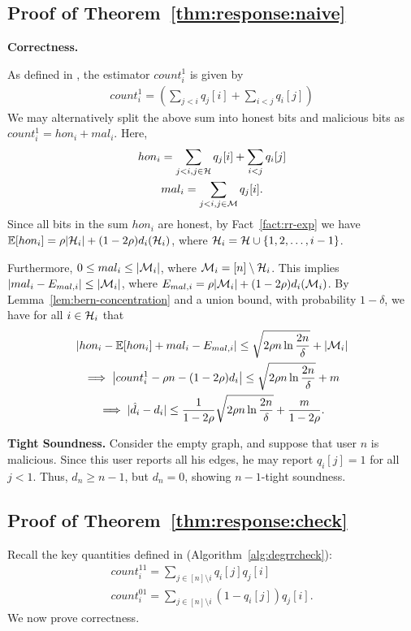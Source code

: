 \subsection{Proof of Theorem~\ref{thm:response:naive}}\label{app:thm:response:naive}
\noindent \textbf{Correctness.}

As defined in \DegRRNaive{}, the estimator $count_i^1$ is given by 
\begin{gather}count^1_i=(\sum_{j < i} q_j[i] + \sum_{i < j} q_i[j])\end{gather}
We may alternatively split the above sum into honest bits and malicious bits as $count^1_i = hon_i + mal_i$. Here, 
\begin{gather*}
hon_i = \sum_{j < i, j \in \mathcal{H}} q_j[i] + \sum_{i < j} q_i[j] \\
mal_i = \sum_{j < i, j \in \mathcal{M}} q_j[i].
\end{gather*}
Since all bits in the sum $hon_i$ are honest, by Fact~\ref{fact:rr-exp} we have $\operatorname{\mathbb{E}}[hon_i] = \rho|\mathcal{H}_i| + (1-2\rho) d_i(\mathcal{H}_i)$, where $\mathcal{H}_i = \mathcal{H} \cup \{1, 2, \ldots, i-1\}$. 

Furthermore, $0 \leq mal_i \leq |\mathcal{M}_i|$, where $\mathcal{M}_i = [n] \setminus \mathcal{H}_i$. This implies $|mal_i - E_{mal,i}| \leq |\mathcal{M}_i|$, where $E_{mal,i} = \rho|\mathcal{M}_i| + (1-2\rho) d_i(\mathcal{M}_i)$.
By Lemma~\ref{lem:bern-concentration} and a union bound, with probability $1-\delta$, we have for all $i \in \mathcal{H}_i$ that
\begin{gather*}
\left|hon_i - \operatorname{\mathbb{E}}[hon_i] + mal_i - E_{mal,i} \right| \leq  \sqrt{2\rho n \ln \frac{2n}{\delta}} + |\mathcal{M}_i| \\ 
\implies \left|count_i^1 - \rho n - (1-2\rho)d_i \right| \leq  \sqrt{2\rho n \ln \frac{2n}{\delta}} + m \\ 
\implies |\hat{d}_i - d_i | \leq \frac{1}{1-2\rho} \sqrt{2\rho n \ln \frac{2n}{\delta}} + \frac{m}{1-2\rho}.
\end{gather*}

\noindent\textbf{Tight Soundness.} Consider the empty graph, and suppose that user $n$ is malicious. Since this user reports all his edges, he may report $q_i[j] = 1$ for all $j < 1$. Thus, $\hat{d}_n \geq n-1$, but $d_n = 0$, showing $n-1$-tight soundness.

\subsection{Proof of Theorem~\ref{thm:response:check}} \label{app:b3a3}
Recall the key quantities defined in \DegRRCheck{} (Algorithm~\ref{alg:degrrcheck}):
\begin{gather}
      count_i^{11} = \sum_{j \in [n] \setminus i} q_{i}[j] q_{j}[i] \\
      count_i^{01} = \sum_{j \in [n] \setminus i} (1-q_{i}[j])q_{j}[i].
\end{gather}
We now prove correctness.

